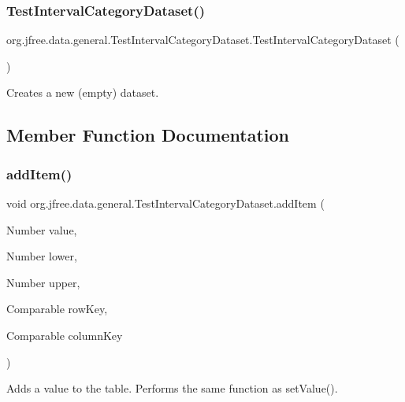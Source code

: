 \subsubsection{\texorpdfstring{Test\+Interval\+Category\+Dataset()}{TestIntervalCategoryDataset()}}
{\footnotesize\ttfamily org.\+jfree.\+data.\+general.\+Test\+Interval\+Category\+Dataset.\+Test\+Interval\+Category\+Dataset (\begin{DoxyParamCaption}{ }\end{DoxyParamCaption})}

Creates a new (empty) dataset. 

\subsection{Member Function Documentation}
\mbox{\label{classorg_1_1jfree_1_1data_1_1general_1_1_test_interval_category_dataset_a7504c0fe50b50cb0718d8c2cad4ff01d}} 
\subsubsection{\texorpdfstring{add\+Item()}{addItem()}\hspace{0.1cm}{\footnotesize\ttfamily [1/2]}}
{\footnotesize\ttfamily void org.\+jfree.\+data.\+general.\+Test\+Interval\+Category\+Dataset.\+add\+Item (\begin{DoxyParamCaption}\item[{Number}]{value,  }\item[{Number}]{lower,  }\item[{Number}]{upper,  }\item[{Comparable}]{row\+Key,  }\item[{Comparable}]{column\+Key }\end{DoxyParamCaption})}

Adds a value to the table. Performs the same function as set\+Value().


